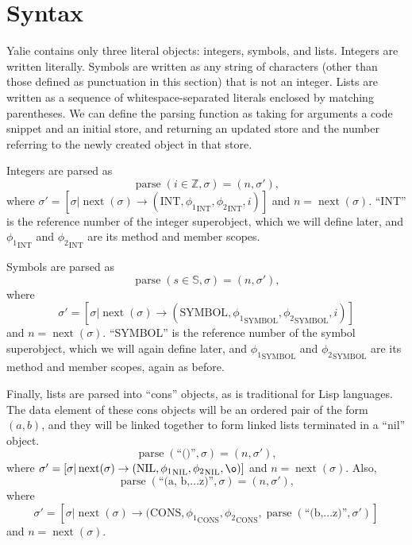 \documentclass[twocolumn]{article}
\begin{document}
\section*{Syntax}

Yalie contains only three literal objects: integers, symbols, and
lists. Integers are written literally. Symbols are written as any
string of characters (other than those defined as punctuation in this
section) that is not an integer. Lists are written as a sequence of
whitespace-separated literals enclosed by matching parentheses. We can
define the parsing function as taking for arguments a code snippet and
an initial store, and returning an updated store and the number
referring to the newly created object in that store.

Integers are parsed as
\begin{equation}
\operatorname{parse}(i\in\mathbb{Z},\sigma) = (n,\sigma'),
\end{equation}
where $\sigma' = [\sigma|\operatorname{next}(\sigma) \rightarrow
(\text{INT}, {\phi_1}_{\text{INT}}, {\phi_2}_{\text{INT}}, i)]$ and
$n=\operatorname{next}(\sigma)$. ``INT'' is the reference number of
the integer superobject, which we will define later, and
${\phi_1}_{\text{INT}}$ and ${\phi_2}_{\text{INT}}$ are its method and
member scopes.

Symbols are parsed as
\[ \operatorname{parse}(s\in\mathbb{S},\sigma) = (n,\sigma'),\]
where \[\sigma' = [\sigma|\operatorname{next}(\sigma) \rightarrow
(\text{SYMBOL}, {\phi_1}_{\text{SYMBOL}}, {\phi_2}_{\text{SYMBOL}},
i)]\] and $n=\operatorname{next}(\sigma)$. ``SYMBOL'' is the reference
number of the symbol superobject, which we will again define later,
and ${\phi_1}_{\text{SYMBOL}}$ and ${\phi_2}_{\text{SYMBOL}}$ are its
method and member scopes, again as before.

Finally, lists are parsed into ``cons'' objects, as is traditional for
Lisp languages. The data element of these cons objects will be an
ordered pair of the form $(a,b)$, and they will be linked together to
form linked lists terminated in a ``nil'' object.
\[ \operatorname{parse}(\text{``()''},\sigma) = (n,\sigma'),\]
where $\sigma' = [\sigma|\operatorname{next}(\sigma) \rightarrow
(\text{NIL}, {\phi_1}_{\text{NIL}}, {\phi_2}_{\text{NIL}},
\o)]$ and $n=\operatorname{next}(\sigma)$. Also,
\[ \operatorname{parse}(\text{``(a, b,\ldots z)''},\sigma) =
(n,\sigma'),\] where \[\sigma' = [\sigma|\operatorname{next}(\sigma)
\rightarrow (\text{CONS}, {\phi_1}_{\text{CONS}},
{\phi_2}_{\text{CONS}}, \operatorname{parse}(\text{``(b,\ldots
  z)''},\sigma')]\] and $n=\operatorname{next}(\sigma)$.
\end{document}
